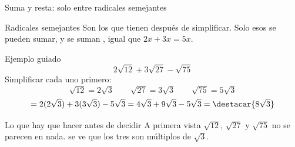 \documentclass[aspectratio=169,10pt]{beamer}
\begin{document}
\begin{frame}{Suma y resta: solo entre radicales semejantes}
  \scriptsize
  \begin{block}{Radicales semejantes}
    \tiny
    Son los que tienen  después de
    simplificar. Solo esos se pueden sumar, y se suman , igual que $2x + 3x = 5x$.
  \end{block}

  \vspace{0.08cm}
  \begin{exampleblock}{Ejemplo guiado}
    \scriptsize
    \[ 2\sqrt{12} + 3\sqrt{27} - \sqrt{75} \]
    Simplificar cada uno primero:
    \[ \sqrt{12} = 2\sqrt{3} \qquad \sqrt{27} = 3\sqrt{3}
       \qquad \sqrt{75} = 5\sqrt{3} \]
    \[ = 2(2\sqrt{3}) + 3(3\sqrt{3}) - 5\sqrt{3}
       = 4\sqrt{3} + 9\sqrt{3} - 5\sqrt{3} = \destacar{8\sqrt{3}} \]
  \end{exampleblock}

  \vspace{0.05cm}
  \begin{alertblock}{Lo que hay que hacer antes de decidir}
    \tiny
    A primera vista $\sqrt{12}$, $\sqrt{27}$ y $\sqrt{75}$ no se parecen en
    nada.  se ve que los tres son
    múltiplos de $\sqrt{3}$. 
  \end{alertblock}
\end{frame}
\end{document}
